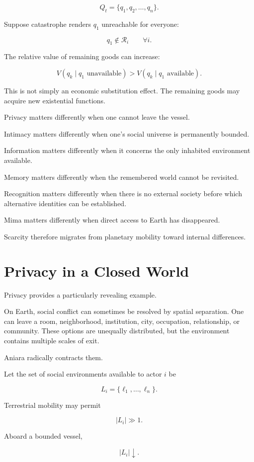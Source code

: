 \documentclass[11pt,oneside]{book}
\theoremstyle{definition}
\theoremstyle{remark}
\newcommand{\R}{\mathcal{R}}
\begin{document}
\[
Q_t
=
\{
q_1,q_2,\ldots,q_n
\}.
\]

Suppose catastrophe renders \(q_1\) unreachable for everyone:

\[
q_1\notin\R_i
\qquad
\forall i.
\]

The relative value of remaining goods can increase:

\[
V(q_k\mid q_1\text{ unavailable})
>
V(q_k\mid q_1\text{ available}).
\]

This is not simply an economic substitution effect. The remaining goods may acquire new existential functions.

Privacy matters differently when one cannot leave the vessel.

Intimacy matters differently when one's social universe is permanently bounded.

Information matters differently when it concerns the only inhabited environment available.

Memory matters differently when the remembered world cannot be revisited.

Recognition matters differently when there is no external society before which alternative identities can be established.

Mima matters differently when direct access to Earth has disappeared.

Scarcity therefore migrates from planetary mobility toward internal differences.

\section{Privacy in a Closed World}

Privacy provides a particularly revealing example.

On Earth, social conflict can sometimes be resolved by spatial separation. One can leave a room, neighborhood, institution, city, occupation, relationship, or community. These options are unequally distributed, but the environment contains multiple scales of exit.

Aniara radically contracts them.

Let the set of social environments available to actor \(i\) be

\[
L_i
=
\{
\ell_1,\ldots,\ell_n
\}.
\]

Terrestrial mobility may permit

\[
|L_i|\gg1.
\]

Aboard a bounded vessel,

\[
|L_i|\downarrow.
\]
\end{document}
